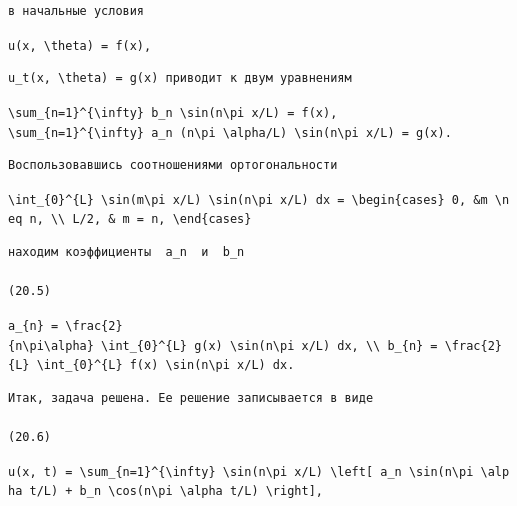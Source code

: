 \documentclass[
  ukrainian,
]{article}
\begin{document}
\begin{verbatim}
в начальные условия
\end{verbatim}

\texttt{u(x,\ \textbackslash{}theta)\ =\ f(x),}

\begin{verbatim}
u_t(x, \theta) = g(x) приводит к двум уравнениям
\end{verbatim}

\texttt{\textbackslash{}sum\_\{n=1\}\^{}\{\textbackslash{}infty\}\ b\_n\ \textbackslash{}sin(n\textbackslash{}pi\ x/L)\ =\ f(x),}
\texttt{\textbackslash{}sum\_\{n=1\}\^{}\{\textbackslash{}infty\}\ a\_n\ (n\textbackslash{}pi\ \textbackslash{}alpha/L)\ \textbackslash{}sin(n\textbackslash{}pi\ x/L)\ =\ g(x).}

\begin{verbatim}
Воспользовавшись соотношениями ортогональности
\end{verbatim}

\texttt{\textbackslash{}int\_\{0\}\^{}\{L\}\ \textbackslash{}sin(m\textbackslash{}pi\ x/L)\ \textbackslash{}sin(n\textbackslash{}pi\ x/L)\ dx\ =\ \textbackslash{}begin\{cases\}\ 0,\ \&m\ \textbackslash{}neq\ n,\ \textbackslash{}\textbackslash{}\ L/2,\ \&\ m\ =\ n,\ \textbackslash{}end\{cases\}}

\begin{verbatim}
находим коэффициенты  a_n  и  b_n 

(20.5)
\end{verbatim}

\texttt{a\_\{n\}\ =\ \textbackslash{}frac\{2\}\{n\textbackslash{}pi\textbackslash{}alpha\}\ \textbackslash{}int\_\{0\}\^{}\{L\}\ g(x)\ \textbackslash{}sin(n\textbackslash{}pi\ x/L)\ dx,\ \textbackslash{}\textbackslash{}\ b\_\{n\}\ =\ \textbackslash{}frac\{2\}\{L\}\ \textbackslash{}int\_\{0\}\^{}\{L\}\ f(x)\ \textbackslash{}sin(n\textbackslash{}pi\ x/L)\ dx.}

\begin{verbatim}
Итак, задача решена. Ее решение записывается в виде

(20.6)
\end{verbatim}

\texttt{u(x,\ t)\ =\ \textbackslash{}sum\_\{n=1\}\^{}\{\textbackslash{}infty\}\ \textbackslash{}sin(n\textbackslash{}pi\ x/L)\ \textbackslash{}left{[}\ a\_n\ \textbackslash{}sin(n\textbackslash{}pi\ \textbackslash{}alpha\ t/L)\ +\ b\_n\ \textbackslash{}cos(n\textbackslash{}pi\ \textbackslash{}alpha\ t/L)\ \textbackslash{}right{]},}
\end{document}
